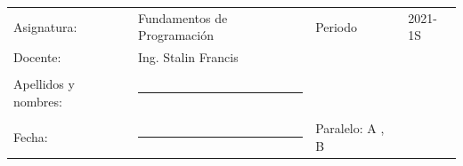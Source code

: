 \documentclass[12pt]{exam}
\begin{document}
\begin{table}[H]
  \centering
  \begin{tabular}[H]{llll}
    Asignatura: & Fundamentos de Programación & Periodo & 2021-1S\\
    Docente: & Ing. Stalin Francis &  & \\
              &                     &            & \\     
    Apellidos y nombres: &\rule{7cm}{0.4pt}    &  & \\
              &                     &            & \\
    Fecha: &\rule{5cm}{0.4pt}   & Paralelo: A , B& \\
  \end{tabular}
\end{table}
\end{document}
